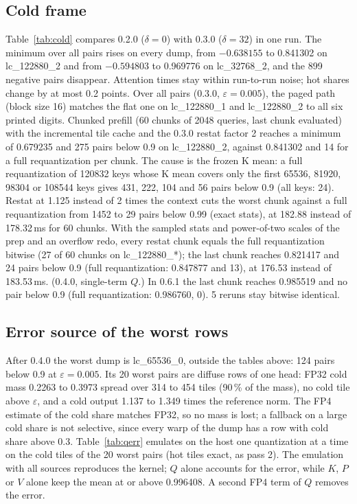\documentclass[10pt,twocolumn]{article}
\newcommand{\eps}{\varepsilon}
\begin{document}
\subsection{Cold frame}

Table~\ref{tab:cold} compares 0.2.0 ($\delta=0$) with 0.3.0 ($\delta=32$) in one run. The minimum over all
pairs rises on every dump, from $-0.638155$ to 0.841302 on lc\_122880\_2 and from $-0.594803$ to 0.969776 on
lc\_32768\_2, and the 899 negative pairs disappear. Attention times stay within run-to-run noise; hot shares
change by at most 0.2 points. Over all pairs (0.3.0, $\eps=0.005$), the paged path (block size 16) matches
the flat one on lc\_122880\_1 and lc\_122880\_2 to all six printed digits. Chunked prefill (60 chunks of
2048 queries, last chunk evaluated) with the incremental tile cache and the 0.3.0 restat factor 2 reaches a
minimum of 0.679235 and 275 pairs below 0.9 on lc\_122880\_2, against 0.841302 and 14 for a full
requantization per chunk. The cause is the frozen K mean: a full requantization of 120832 keys whose K mean
covers only the first 65536, 81920, 98304 or 108544 keys gives 431, 222, 104 and 56 pairs below 0.9 (all keys:
24). Restat at 1.125 instead of 2 times the context cuts the worst chunk against a full requantization from
1452 to 29 pairs below 0.99 (exact stats), at 182.88 instead of 178.32\,ms for 60 chunks. With the sampled stats and
power-of-two scales of the prep and an overflow redo, every restat chunk equals the full requantization bitwise
(27 of 60 chunks on lc\_122880\_*); the last chunk reaches 0.821417 and 24 pairs below 0.9 (full
requantization: 0.847877 and 13), at 176.53 instead of 183.53\,ms. (0.4.0, single-term $Q$.)
In 0.6.1 the last chunk reaches 0.985519 and no pair below 0.9 (full requantization: 0.986760, 0). 5 reruns stay
bitwise identical.

\subsection{Error source of the worst rows}
\label{sec:qerr}

After 0.4.0 the worst dump is lc\_65536\_0, outside the tables above: 124 pairs below 0.9 at $\eps=0.005$. Its
20 worst pairs are diffuse rows of one head: FP32 cold mass 0.2263 to 0.3973 spread over 314 to 454 tiles (90\,\%
of the mass), no cold tile above $\eps$, and a cold output 1.137 to 1.349 times the reference norm. The FP4
estimate of the cold share matches FP32, so no mass is lost; a fallback on a large cold share is not selective,
since every warp of the dump has a row with cold share above 0.3. Table~\ref{tab:qerr} emulates on the host one
quantization at a time on the cold tiles of the 20 worst pairs (hot tiles exact, as pass 2). The emulation with
all sources reproduces the kernel; $Q$ alone accounts for the error, while $K$, $P$ or $V$ alone keep the mean
at or above 0.996408. A second FP4 term of $Q$ removes the error.
\end{document}

